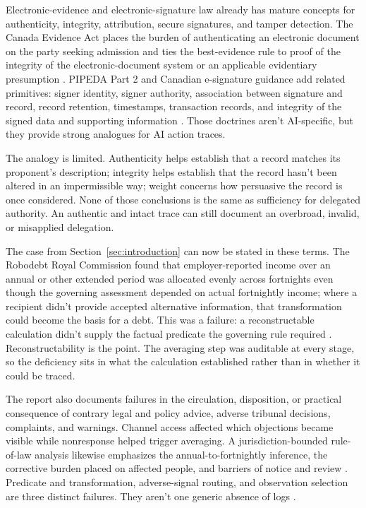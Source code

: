 Electronic-evidence and electronic-signature law already has mature concepts for authenticity, integrity, attribution, secure signatures, and tamper detection. The Canada Evidence Act places the burden of authenticating an electronic document on the party seeking admission and ties the best-evidence rule to proof of the integrity of the electronic-document system or an applicable evidentiary presumption \citep{canadaEvidenceAct1985}. PIPEDA Part 2 and Canadian e-signature guidance add related primitives: signer identity, signer authority, association between signature and record, record retention, timestamps, transaction records, and integrity of the signed data and supporting information \citep{pipeda2000,canadaESignatures2025}. Those doctrines aren't AI-specific, but they provide strong analogues for AI action traces.

The analogy is limited. Authenticity helps establish that a record matches its proponent's description; integrity helps establish that the record hasn't been altered in an impermissible way; weight concerns how persuasive the record is once considered. None of those conclusions is the same as sufficiency for delegated authority. An authentic and intact trace can still document an overbroad, invalid, or misapplied delegation.

The case from Section~\ref{sec:introduction} can now be stated in these terms. The Robodebt Royal Commission found that employer-reported income over an annual or other extended period was allocated evenly across fortnights even though the governing assessment depended on actual fortnightly income; where a recipient didn't provide accepted alternative information, that transformation could become the basis for a debt. This was a  failure: a reconstructable calculation didn't supply the factual predicate the governing rule required \citep{robodebtRoyalCommission2023}. Reconstructability is the point. The averaging step was auditable at every stage, so the deficiency sits in what the calculation established rather than in whether it could be traced.

The report also documents failures in the circulation, disposition, or practical consequence of contrary legal and policy advice, adverse tribunal decisions, complaints, and warnings. Channel access affected which objections became visible while nonresponse helped trigger averaging. A jurisdiction-bounded rule-of-law analysis likewise emphasizes the annual-to-fortnightly inference, the corrective burden placed on affected people, and barriers of notice and review \citep{zalnieriuteBennettMosesWilliams2019ruleOfLaw}. Predicate and transformation, adverse-signal routing, and observation selection are three distinct failures. They aren't one generic absence of logs \citep{robodebtRoyalCommission2023}.

